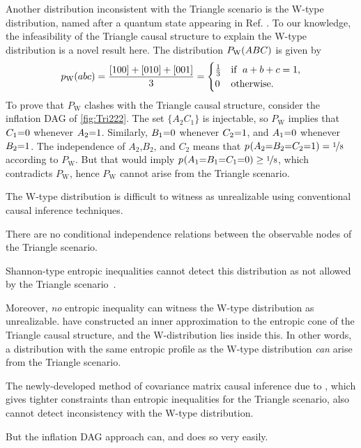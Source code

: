 {\par\smallskip\nobreak
Another distribution inconsistent with the Triangle scenario is the W-type distribution, named after a quantum state appearing in Ref. \cite{3Qubits2Ways}. To our knowledge, the infeasibility of the Triangle causal structure to explain the W-type distribution is a novel result here. The distribution $P_{\text{W}}\lparen A B C\rparen$ is given by
\begin{align}\label{eq:wdistribution1}
p_{\text{W}}\lparen a b c\rparen=\frac{[100]+[010]+[001]}{3}=\begin{cases}\tfrac{1}{3}&\text{if }\; a+b+c=1, \\ 0&\text{otherwise}.\end{cases}
\end{align}
To prove that  $P_{\text{W}}$ clashes with the Triangle causal structure, consider the inflation DAG of \cref{fig:Tri222}. The set $\{A_2 C_1\}$ is injectable, so $P_{\text{W}}$ implies that $C_1\mathord{=} 0$ whenever $A_2 \mathord{=} 1$. Similarly, $B_1\mathord{=} 0$ whenever $C_2\mathord{=} 1$, and $A_1\mathord{=} 0$ whenever $B_2\mathord{=} 1$. The independence of $A_2$,$B_2$, and $C_2$ means that ${p_{}}\lparen A_2\mathord{=} B_2\mathord{=} C_2\mathord{=} 1\rparen=\nicefrac{1}{8}$ according to $P_{\text{W}}$. But that would imply ${p_{}}\lparen A_1\mathord{=} B_1\mathord{=} C_1\mathord{=} 0\rparen\geq\nicefrac{1}{8}$, which contradicts $P_{\text{W}}$, hence $P_{\text{W}}$ cannot arise from the Triangle scenario.

The W-type distribution is difficult to witness as unrealizable using conventional causal inference techniques.
\begin{compactenum}
\item There are no conditional independence relations between the observable nodes of the Triangle scenario. %
\item Shannon-type entropic inequalities cannot detect this distribution as not allowed by the Triangle scenario~\cite{fritz2013marginal,chaves2014novel,chaves2014informationinference}. 
\item Moreover, \emph{no} entropic inequality can witness the W-type distribution as unrealizable. \citet{weilenmann2016entropic} have constructed an inner approximation to the entropic cone of the Triangle causal structure, and the W-distribution lies inside this. In other words, a distribution with the same entropic profile as the W-type distribution \emph{can} arise from the Triangle scenario.
\item The newly-developed method of covariance matrix causal inference due to \citet{kela2016covariance}, which gives tighter constraints than entropic inequalities for the Triangle scenario, also cannot detect inconsistency with the W-type distribution.
\end{compactenum}
\par\noindent But the inflation DAG approach can, and does so very easily.


}
